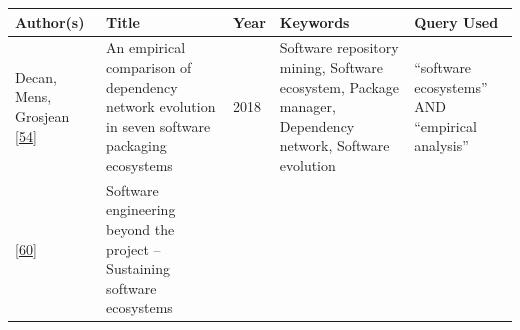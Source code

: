 \documentclass[]{book}
\begin{document}
\begin{longtable}[]{@{}lllll@{}}
\toprule
\begin{minipage}[b]{0.05\columnwidth}\raggedright\strut
Author(s)\strut
\end{minipage} & \begin{minipage}[b]{0.31\columnwidth}\raggedright\strut
Title\strut
\end{minipage} & \begin{minipage}[b]{0.02\columnwidth}\raggedright\strut
Year\strut
\end{minipage} & \begin{minipage}[b]{0.34\columnwidth}\raggedright\strut
Keywords\strut
\end{minipage} & \begin{minipage}[b]{0.13\columnwidth}\raggedright\strut
Query Used\strut
\end{minipage}\tabularnewline
\midrule
\endhead
\begin{minipage}[t]{0.05\columnwidth}\raggedright\strut
Decan, Mens, Grosjean {[}\protect\hyperlink{ref-Decan2018}{54}{]}\strut
\end{minipage} & \begin{minipage}[t]{0.31\columnwidth}\raggedright\strut
An empirical comparison of dependency network evolution in seven
software packaging ecosystems\strut
\end{minipage} & \begin{minipage}[t]{0.02\columnwidth}\raggedright\strut
2018\strut
\end{minipage} & \begin{minipage}[t]{0.34\columnwidth}\raggedright\strut
Software repository mining, Software ecosystem, Package manager,
Dependency network, Software evolution\strut
\end{minipage} & \begin{minipage}[t]{0.13\columnwidth}\raggedright\strut
``software ecosystems'' AND ``empirical analysis''\strut
\end{minipage}\tabularnewline
\begin{minipage}[t]{0.05\columnwidth}\raggedright\strut
{[}\protect\hyperlink{ref-Dittrich2014}{60}{]}\strut
\end{minipage} & \begin{minipage}[t]{0.31\columnwidth}\raggedright\strut
Software engineering beyond the project -- Sustaining software
ecosystems\strut
\end{minipage} & \begin{minipage}[t]{0.02\columnwidth}\raggedright\strut

\end{minipage}
\end{longtable}
\end{document}
